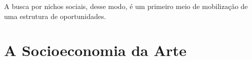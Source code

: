 \documentclass[a4paper, 12pt, openright, oneside, german, french, english, brazil]{abntex2}
\begin{document}
	A busca por nichos sociais, desse modo, é um primeiro meio de mobilização de uma estrutura de oportunidades.
	
	
	
	
	
	\chapter{A Socioeconomia da Arte}
	

\end{document}
